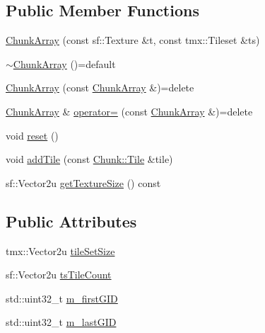 \subsection*{Public Member Functions}
\begin{DoxyCompactItemize}
\item 
\hyperlink{classMapLayer_1_1Chunk_1_1ChunkArray_a566f7f2c8c1fd2405ed8a359a9cf8717}{Chunk\+Array} (const sf\+::\+Texture \&t, const tmx\+::\+Tileset \&ts)
\item 
\hyperlink{classMapLayer_1_1Chunk_1_1ChunkArray_a032e0fa8a35d86815109eb0e1296c567}{$\sim$\+Chunk\+Array} ()=default
\item 
\hyperlink{classMapLayer_1_1Chunk_1_1ChunkArray_a85a82c50eae1a835b7a355813b560cbf}{Chunk\+Array} (const \hyperlink{classMapLayer_1_1Chunk_1_1ChunkArray}{Chunk\+Array} \&)=delete
\item 
\hyperlink{classMapLayer_1_1Chunk_1_1ChunkArray}{Chunk\+Array} \& \hyperlink{classMapLayer_1_1Chunk_1_1ChunkArray_ad5c7843e61bbddfb1be30ec93d75510f}{operator=} (const \hyperlink{classMapLayer_1_1Chunk_1_1ChunkArray}{Chunk\+Array} \&)=delete
\item 
void \hyperlink{classMapLayer_1_1Chunk_1_1ChunkArray_a4f93efce951889766d0336525e697cdd}{reset} ()
\item 
void \hyperlink{classMapLayer_1_1Chunk_1_1ChunkArray_a5d3cc7cca03c66402b6a73978e1440dc}{add\+Tile} (const \hyperlink{classMapLayer_1_1Chunk_a2137a288bfd4120eb3e4db5934b802f3}{Chunk\+::\+Tile} \&tile)
\item 
sf\+::\+Vector2u \hyperlink{classMapLayer_1_1Chunk_1_1ChunkArray_a6de1bdb0370138d0b63b8817da6fb2a2}{get\+Texture\+Size} () const
\end{DoxyCompactItemize}
\subsection*{Public Attributes}
\begin{DoxyCompactItemize}
\item 
tmx\+::\+Vector2u \hyperlink{classMapLayer_1_1Chunk_1_1ChunkArray_a2338cdb0f900b21dd175ac86f7d4d984}{tile\+Set\+Size}
\item 
sf\+::\+Vector2u \hyperlink{classMapLayer_1_1Chunk_1_1ChunkArray_a2248df4d35f691b2b2afe3aeb02f50ed}{ts\+Tile\+Count}
\item 
std\+::uint32\+\_\+t \hyperlink{classMapLayer_1_1Chunk_1_1ChunkArray_a5f4d6066ddf867552b992d8215fbffcb}{m\+\_\+first\+G\+ID}
\item 
std\+::uint32\+\_\+t \hyperlink{classMapLayer_1_1Chunk_1_1ChunkArray_a02890e0578dbc2550e74ac1734b6c608}{m\+\_\+last\+G\+ID}
\end{DoxyCompactItemize}
